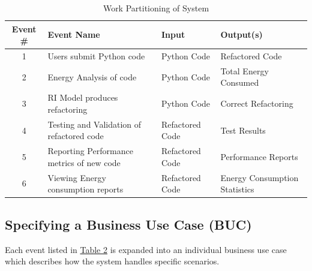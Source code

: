 \documentclass[12pt]{article}
\begin{document}
\begin{table}[H]
  \centering
  \setlength\extrarowheight{5mm}
  \begin{tabularx}{\textwidth}{|c|X|l|p{1.5in}|}
    \toprule \textbf{Event \#} & \textbf{Event Name} & \textbf{Input}
    & \textbf{Output(s)} \\
    \midrule
    1 & Users submit Python code & Python Code & Refactored Code\\
    2 & Energy Analysis of code & Python Code & Total Energy Consumed \\
    3 & RI Model produces refactoring & Python Code & Correct Refactoring \\
    4 & Testing and Validation of refactored code & Refactored Code &
    Test Results \\
    5 & Reporting Performance metrics of new code & Refactored Code &
    Performance Reports \\
    6 & Viewing Energy consumption reports & Refactored Code & Energy
    Consumption Statistics \\
    \bottomrule
  \end{tabularx}
  \caption{Work Partitioning of System}
  \label{tab:work-part}
\end{table}

\subsection{Specifying a Business Use Case (BUC)}
Each event listed in \hyperref[tab:work-part]{Table 2} is expanded
into an individual business use case which describes how the system
handles specific scenarios.
\end{document}
